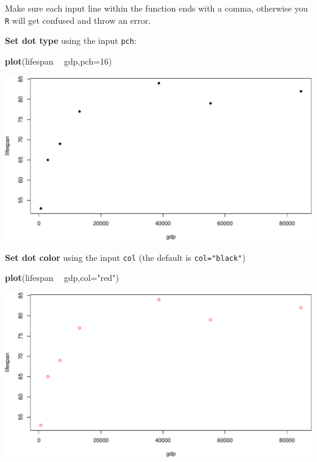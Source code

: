 \documentclass[]{book}
\newenvironment{Shaded}{\begin{snugshade}}{\end{snugshade}}
\newcommand{\DataTypeTok}[1]{\textcolor[rgb]{0.13,0.29,0.53}{#1}}
\newcommand{\DecValTok}[1]{\textcolor[rgb]{0.00,0.00,0.81}{#1}}
\newcommand{\KeywordTok}[1]{\textcolor[rgb]{0.13,0.29,0.53}{\textbf{#1}}}
\newcommand{\NormalTok}[1]{#1}
\newcommand{\OperatorTok}[1]{\textcolor[rgb]{0.81,0.36,0.00}{\textbf{#1}}}
\newcommand{\StringTok}[1]{\textcolor[rgb]{0.31,0.60,0.02}{#1}}
\begin{document}
Make sure each input line within the function ends with a comma, otherwise you \texttt{R} will get confused and throw an error.

\textbf{Set dot type} using the input \texttt{pch}:

\begin{Shaded}
\begin{Highlighting}[]
\KeywordTok{plot}\NormalTok{(lifespan }\OperatorTok{~}\StringTok{ }\NormalTok{gdp,}\DataTypeTok{pch=}\DecValTok{16}\NormalTok{)}
\end{Highlighting}
\end{Shaded}

\includegraphics{figures/unnamed-chunk-229-1.pdf}

\textbf{Set dot color} using the input \texttt{col} (the default is \texttt{col="black"})

\begin{Shaded}
\begin{Highlighting}[]
\KeywordTok{plot}\NormalTok{(lifespan }\OperatorTok{~}\StringTok{ }\NormalTok{gdp,}\DataTypeTok{col=}\StringTok{"red"}\NormalTok{)}
\end{Highlighting}
\end{Shaded}

\includegraphics{figures/unnamed-chunk-230-1.pdf}
\end{document}
